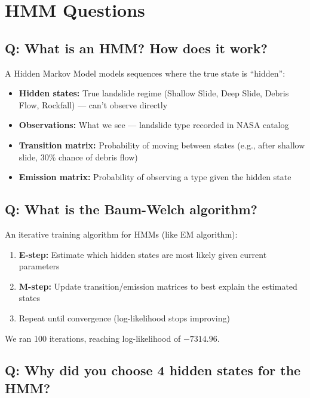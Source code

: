 \documentclass[11pt]{article}
\begin{document}
\section{HMM Questions}

\subsection{Q: What is an HMM? How does it work?}

A Hidden Markov Model models sequences where the true state is ``hidden'':

\begin{itemize}[noitemsep]
    \item \textbf{Hidden states:} True landslide regime (Shallow Slide, Deep Slide, Debris Flow, Rockfall) --- can't observe directly
    \item \textbf{Observations:} What we see --- landslide type recorded in NASA catalog
    \item \textbf{Transition matrix:} Probability of moving between states (e.g., after shallow slide, 30\% chance of debris flow)
    \item \textbf{Emission matrix:} Probability of observing a type given the hidden state
\end{itemize}

\subsection{Q: What is the Baum-Welch algorithm?}

An iterative training algorithm for HMMs (like EM algorithm):
\begin{enumerate}[noitemsep]
    \item \textbf{E-step:} Estimate which hidden states are most likely given current parameters
    \item \textbf{M-step:} Update transition/emission matrices to best explain the estimated states
    \item Repeat until convergence (log-likelihood stops improving)
\end{enumerate}

We ran 100 iterations, reaching log-likelihood of $-7314.96$.

\subsection{Q: Why did you choose 4 hidden states for the HMM?}
\end{document}
